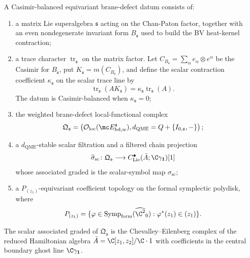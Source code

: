 \begin{defn}\label{defn:super-balanced-equivariant-qme-datum}
  A Casimir-balanced equivariant brane-defect datum consists of:
  \begin{enumerate}[label=(\roman*)]
    \item a matrix Lie superalgebra \(\mathfrak s\) acting on the
      Chan-Paton factor, together with an even nondegenerate invariant
      form \(B_{\mathfrak s}\) used to build the BV heat-kernel
      contraction;
    \item a trace character \(\operatorname{tr}_{\mathfrak s}\) on the
      matrix factor.  Let
      \(C_{B_{\mathfrak s}}=\sum_\alpha e_\alpha\otimes e^\alpha\) be the
      Casimir for \(B_{\mathfrak s}\), put
      \(K_{\mathfrak s}=m(C_{B_{\mathfrak s}})\), and define the scalar
      contraction coefficient \(\kappa_{\mathfrak s}\) on the scalar
      trace line by
      \[
        \operatorname{tr}_{\mathfrak s}(A K_{\mathfrak s})
        =
        \kappa_{\mathfrak s}\operatorname{tr}_{\mathfrak s}(A).
      \]
      The datum is Casimir-balanced when \(\kappa_{\mathfrak s}=0\);
    \item the weighted brane-defect local-functional complex
      \[
        \mathfrak Q_{\mathfrak s}=
        \left(
        \mathcal O_{\mathrm{loc}}(\mc E^{\mathfrak s}_{\mathrm{bd},w}),
        d_{\mathrm{QME}}=Q+\{I_{0,\mathfrak s},-\}
        \right);
      \]
    \item a \(d_{\mathrm{QME}}\)-stable scalar filtration and a filtered
      chain projection
      \[
        \widehat\sigma_{\mathrm{sc}}\colon
        \mathfrak Q_{\mathfrak s}
        \longrightarrow
        C^\bullet_{\mathrm{Lie}}(\bar A;\C\gamma_{\mathbf 1})[1]
      \]
      whose associated graded is the scalar-symbol map
      \(\sigma_{\mathrm{sc}}\);
    \item a \(P_{(z_1)}\)-equivariant coefficient topology on the formal
      symplectic polydisk, where
      \[
        P_{(z_1)}=\{\varphi\in
        \operatorname{Symp}_{\mathrm{form}}(\widehat{\C^2}_0):
        \varphi^*(z_1)\in (z_1)\}.
      \]
  \end{enumerate}
  The scalar associated graded of \(\mathfrak Q_{\mathfrak s}\) is the
  Chevalley--Eilenberg complex of the reduced Hamiltonian algebra
  \(\bar A=\C[z_1,z_2]/\C\cdot1\) with coefficients in the central
  boundary ghost line \(\C\gamma_{\mathbf 1}\).
\end{defn}

